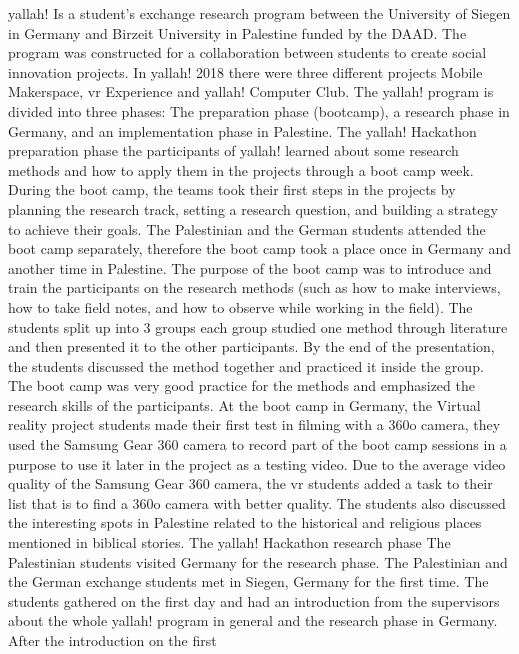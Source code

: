 \acrshort{yallah!} Is a student’s exchange research program between the University of Siegen in
Germany and Birzeit University in Palestine funded by the DAAD. The program was
constructed for a collaboration between students to create social innovation projects.
In \acrshort{yallah!} 2018 there were three different projects Mobile Makerspace, \acrshort{vr} Experience and
\acrshort{yallah!} Computer Club. The \acrshort{yallah!} program is divided into three phases: The preparation
phase (bootcamp), a research phase in Germany, and an implementation phase in Palestine.
The \acrshort{yallah!} Hackathon preparation phase
the participants of \acrshort{yallah!} learned about some research methods and how to apply them in
the projects through a boot camp week. During the boot camp, the teams took their first
steps in the projects by planning the research track, setting a research question, and building
a strategy to achieve their goals.
The Palestinian and the German students attended the boot camp separately, therefore the
boot camp took a place once in Germany and another time in Palestine. The purpose of the
boot camp was to introduce and train the participants on the research methods (such as how
to make interviews, how to take field notes, and how to observe while working in the field).
The students split up into 3 groups each group studied one method through literature and
then presented it to the other participants. By the end of the presentation, the students
discussed the method together and practiced it inside the group. The boot camp was very
good practice for the methods and emphasized the research skills of the participants. At the
boot camp in Germany, the Virtual reality project students made their first test in filming with
a 360o camera, they used the Samsung Gear 360 camera to record part of the boot camp
sessions in a purpose to use it later in the project as a testing video. Due to the average video
quality of the Samsung Gear 360 camera, the \acrshort{vr} students added a task to their list that is to
find a 360o camera with better quality. The students also discussed the interesting spots in
Palestine related to the historical and religious places mentioned in biblical stories.
The \acrshort{yallah!} Hackathon research phase
The Palestinian students visited Germany for the research phase. The Palestinian and the
German exchange students met in Siegen, Germany for the first time. The students gathered
on the first day and had an introduction from the supervisors about the whole \acrshort{yallah!}
program in general and the research phase in Germany. After the introduction on the first

